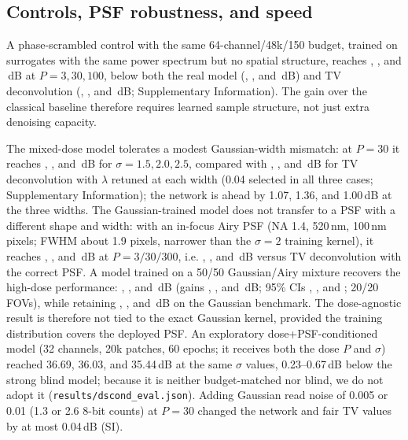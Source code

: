 \documentclass[preprint,12pt]{elsarticle}
\begin{document}
\subsection{Controls, PSF robustness, and speed}
A phase-scrambled control with the same 64-channel/48k/150 budget, trained on
surrogates with the same power spectrum but no spatial structure, reaches
\ScrPthree, \ScrPthirty, and \ScrPonehundred\,dB at $P=3,30,100$,
below both the real model (\UNetPthree, \UNetPthirty, and \UNetPonehundred\,dB)
and TV deconvolution (\DecPthree, \DecPthirty, and \DecPonehundred\,dB;
Supplementary Information). The gain over the classical
baseline therefore requires learned sample structure, not just extra denoising
capacity.

The mixed-dose model tolerates a modest Gaussian-width mismatch: at $P=30$ it reaches
\SigmaUPfifteen, \SigmaUPtwo, and \SigmaUPtwopfive\,dB for $\sigma=1.5,2.0,2.5$,
compared with \SigmaDecfifteen, \SigmaDectwo, and \SigmaDectwopfive\,dB for
TV deconvolution with $\lambda$ retuned at each width (0.04 selected in all
three cases; Supplementary Information); the network is ahead by 1.07, 1.36,
and 1.00\,dB at the three widths. The
Gaussian-trained model does not transfer to a PSF with a different shape and
width: with an in-focus Airy PSF (NA 1.4, 520\,nm, 100\,nm pixels; FWHM about
1.9 pixels, narrower than the $\sigma=2$ training kernel), it reaches
\AiryStrongUThree,
\AiryStrongUThirty, and \AiryStrongUThreeHundred\,dB at $P=3/30/300$, i.e.
\AiryStrongGainThree, \AiryStrongGainThirty, and
\AiryStrongGainThreeHundred\,dB versus TV deconvolution with the correct PSF. A
model trained on a 50/50 Gaussian/Airy mixture recovers the high-dose
performance: \AiryUThree, \AiryUThirty, and \AiryUThreeHundred\,dB (gains
\AiryGainThree, \AiryGainThirty, and \AiryGainThreeHundred\,dB; 95\% CIs
\AiryCIThree, \AiryCIThirty, and \AiryCIThreeHundred; 20/20 FOVs), while
retaining \PsfMixGaussPThree, \PsfMixGaussPThirty, and
\PsfMixGaussPThreeHundred\,dB on the Gaussian benchmark. The dose-agnostic
result is therefore not tied to the exact Gaussian kernel, provided the
training distribution covers the deployed PSF. An
exploratory dose+PSF-conditioned model (32 channels, 20k patches, 60 epochs;
it receives both the dose $P$ and $\sigma$) reached 36.69, 36.03, and
35.44\,dB at the same $\sigma$ values, 0.23--0.67\,dB below the strong blind
model; because it is neither budget-matched nor blind, we do not adopt it
(\texttt{results/dscond\_eval.json}). Adding Gaussian read
noise of 0.005 or 0.01 (1.3 or 2.6 8-bit counts) at $P=30$ changed the
network and fair TV values by at most 0.04\,dB (SI).
\end{document}
